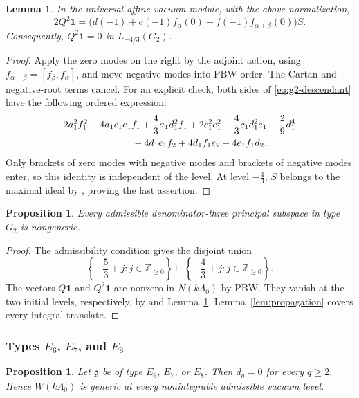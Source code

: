\documentclass[11pt]{amsart}
\newtheorem{proposition}[theorem]{Proposition}
\newtheorem{lemma}[theorem]{Lemma}
\theoremstyle{definition}
\theoremstyle{remark}
\newcommand{\Z}{\mathbb Z}
\newcommand{\vac}{\mathbf1}
\begin{document}
\begin{lemma}\label{lem:g2-square}
In the universal affine vacuum module, with the above normalization,
\begin{equation}\label{eq:g2-descendant}
 2Q^2\vac=
 \bigl(d(-1)+e(-1)f_\alpha(0)+f(-1)f_{\alpha+\beta}(0)\bigr)S.
\end{equation}
Consequently, $Q^2\vac=0$ in $L_{-4/3}(G_2)$.
\end{lemma}
\begin{proof}
Apply the zero modes on the right by the adjoint action, using
$f_{\alpha+\beta}=[f_\beta,f_\alpha]$, and move negative modes
into PBW order. The Cartan and negative-root terms cancel. For an
explicit check, both sides of \eqref{eq:g2-descendant} have the
following ordered expression:
\begin{align*}
 &2a_1^2f_1^2-4a_1c_1e_1f_1
 +\frac43a_1d_1^2f_1+2c_1^2e_1^2
 -\frac43c_1d_1^2e_1+\frac29d_1^4\\
 &\hspace{25mm}-4d_1e_1f_2+4d_1f_1e_2-4e_1f_1d_2.
\end{align*}
Only brackets of zero modes with negative modes and brackets of
negative modes enter, so this identity is independent of the level.
At level $-\frac43$, $S$ belongs to the maximal ideal by
\cite[Propositions~2.3--2.4]{AL}, proving the last assertion.
\end{proof}

\begin{proposition}\label{prop:g2-nongeneric}
Every admissible denominator-three principal subspace in type $G_2$
is nongeneric.
\end{proposition}
\begin{proof}
The admissibility condition gives the disjoint union
\[
 \left\{-\frac53+j:j\in\Z_{\ge0}\right\}
 \sqcup\left\{-\frac43+j:j\in\Z_{\ge0}\right\}.
\]
The vectors $Q\vac$ and $Q^2\vac$ are nonzero in
$N(k\Lambda_0)$ by PBW. They vanish at the two initial levels,
respectively, by \cite{AL} and Lemma~\ref{lem:g2-square}.
Lemma~\ref{lem:propagation} covers every integral translate.
\end{proof}

\subsubsection{Types $E_6$, $E_7$, and $E_8$}

\begin{proposition}\label{prop:typeE}
Let $\mathfrak g$ be of type $E_6$, $E_7$, or $E_8$.
Then $d_q=0$ for every $q\ge2$. Hence $W(k\Lambda_0)$ is
generic at every nonintegrable admissible vacuum level.
\end{proposition}
\end{document}
